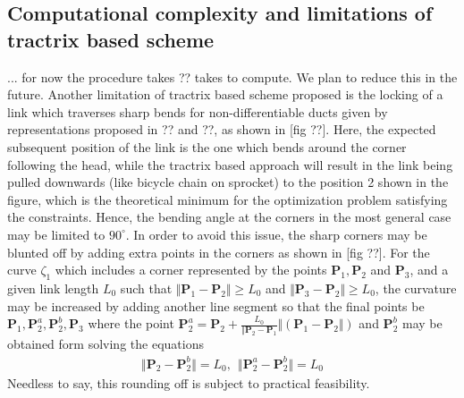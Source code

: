 \documentclass[12pt,a4]{article}
\begin{document}
\subsection{Computational complexity and limitations of tractrix based scheme}

... for now the procedure takes ?? takes to compute. We plan to reduce this in the future.
Another limitation of tractrix based scheme proposed is the locking of a link which traverses sharp bends for non-differentiable ducts given by representations proposed in ?? and ??, as shown in [fig ??]. Here, the expected subsequent position of the link is the one which bends around the corner following the head, while the tractrix based approach will result in the link being pulled downwards (like bicycle chain on sprocket) to the position 2 shown in the figure, which is the theoretical minimum for the optimization problem satisfying the constraints. Hence, the bending angle at the corners in the most general case may be limited to $90^\circ$. In order to avoid this issue, the sharp corners may be blunted off by adding extra points in the corners as shown in [fig ??]. For the curve $\zeta_1$ which includes a corner represented by the points $\mathbf{P}_1,\mathbf{P}_2$ and $\mathbf{P}_3$, and a given link length $L_0$ such that $\Vert \mathbf{P}_1-\mathbf{P}_2\Vert\geq L_0$  and $\Vert \mathbf{P}_3-\mathbf{P}_2\Vert\geq L_0$, the curvature may be increased by adding another line segment so that the final points be $\mathbf{P}_1,\mathbf{P}_2^a,\mathbf{P}_2^b,\mathbf{P}_3$  where the point $\mathbf{P}_2^a=\mathbf{P}_2+\frac{L_0}{\Vert \mathbf{P}_2-\mathbf{P}_1}\Vert\left(\mathbf{P}_1-\mathbf{P}_2\Vert\right)$ and $\mathbf{P}_2^b$ may be obtained form solving the equations
\begin{align}
\Vert \mathbf{P}_2-\mathbf{P}_2^b\Vert = L_0,~~\Vert \mathbf{P}_2^a-\mathbf{P}_2^b\Vert = L_0
\end{align} 
Needless to say, this rounding off is subject to practical feasibility.
\end{document}

